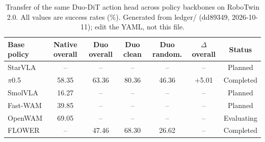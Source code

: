\begin{table}[t]
  \caption{Transfer of the same Duo-DiT action head across policy backbones on RoboTwin 2.0. All values are success rates (\%). Generated from ledger/ (dd89349, 2026-10-11); edit the YAML, not this file.}
  \label{tab:action_head_transfer}
  \centering
  \footnotesize
  \setlength{\tabcolsep}{3pt}
  \renewcommand{\arraystretch}{1.08}
  \begin{tabular*}{\textwidth}{@{\extracolsep{\fill}}lcccccc@{}}
    \toprule
    Base policy & Native overall & Duo overall & Duo clean & Duo random. & $\Delta$ overall & Status \\
    \midrule
    StarVLA & -- & -- & -- & -- & -- & Planned \\
    $\pi$0.5 & 58.35 & 63.36 & 80.36 & 46.36 & +5.01 & Completed \\
    SmolVLA & 16.27 & -- & -- & -- & -- & Planned \\
    Fast-WAM & 39.85 & -- & -- & -- & -- & Planned \\
    OpenWAM & 69.05 & -- & -- & -- & -- & Evaluating \\
    FLOWER & -- & 47.46 & 68.30 & 26.62 & -- & Completed \\
    \bottomrule
  \end{tabular*}
\end{table}
